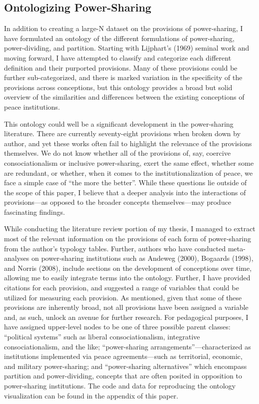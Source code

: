 \documentclass[12pt]{article}
\begin{document}
\subsection{Ontologizing Power-Sharing}
In addition to creating a large-N dataset on the provisions of power-sharing, I have formulated an ontology of the different formulations of power-sharing, power-dividing, and partition. Starting with Lijphart’s (1969) seminal work and moving forward, I have attempted to classify and categorize each different definition and their purported provisions. Many of these provisions could be further sub-categorized, and there is marked variation in the specificity of the provisions across conceptions, but this ontology provides a broad but solid overview of the similarities and differences between the existing conceptions of peace institutions.

This ontology could well be a significant development in the power-sharing literature. There are currently seventy-eight provisions when broken down by author, and yet these works often fail to highlight the relevance of the provisions themselves. We do not know whether all of the provisions of, say, coercive consociationalism or inclusive power-sharing, exert the same effect, whether some are redundant, or whether, when it comes to the institutionalization of peace, we face a simple case of “the more the better”. While these questions lie outside of the scope of this paper, I believe that a deeper analysis into the interactions of provisions—as opposed to the broader concepts themselves—may produce fascinating findings. 

While conducting the literature review portion of my thesis, I managed to extract most of the relevant information on the provisions of each form of power-sharing from the author’s typology tables. Further, authors who have conducted meta-analyses on power-sharing institutions such as Andeweg (2000), Bogaards (1998), and Norris (2008), include sections on the development of conceptions over time, allowing me to easily integrate terms into the ontology. Further, I have provided citations for each provision, and suggested a range of variables that could be utilized for measuring each provision. As mentioned, given that some of these provisions are inherently broad, not all provisions have been assigned a variable and, as such, unlock an avenue for further research. For pedagogical purposes, I have assigned upper-level nodes to be one of three possible parent classes: “political systems” such as liberal consociationalism, integrative consociationalism, and the like; “power-sharing arrangements”—characterized as institutions implemented via peace agreements—such as territorial, economic, and military power-sharing; and “power-sharing alternatives” which encompass partition and power-dividing, concepts that are often posited in opposition to power-sharing institutions. The code and data for reproducing the ontology visualization can be found in the appendix of this paper.
\end{document}
